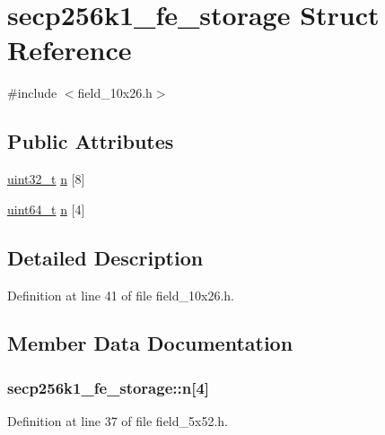 \hypertarget{structsecp256k1__fe__storage}{}\section{secp256k1\+\_\+fe\+\_\+storage Struct Reference}
\label{structsecp256k1__fe__storage}


{\ttfamily \#include $<$field\+\_\+10x26.\+h$>$}

\subsection*{Public Attributes}
\begin{DoxyCompactItemize}
\item 
\hyperlink{stdint_8h_a435d1572bf3f880d55459d9805097f62}{uint32\+\_\+t} \hyperlink{structsecp256k1__fe__storage_a63f0548b6674a57ab1d2c6271008c037}{n} \mbox{[}8\mbox{]}
\item 
\hyperlink{stdint_8h_aaa5d1cd013383c889537491c3cfd9aad}{uint64\+\_\+t} \hyperlink{structsecp256k1__fe__storage_af4231823b7dc6c5f7837f2270d8d19e7}{n} \mbox{[}4\mbox{]}
\end{DoxyCompactItemize}


\subsection{Detailed Description}


Definition at line 41 of file field\+\_\+10x26.\+h.



\subsection{Member Data Documentation}
\hypertarget{structsecp256k1__fe__storage_af4231823b7dc6c5f7837f2270d8d19e7}{}
\subsubsection[{n}]{ secp256k1\+\_\+fe\+\_\+storage\+::n\mbox{[}4\mbox{]}}\label{structsecp256k1__fe__storage_af4231823b7dc6c5f7837f2270d8d19e7}


Definition at line 37 of file field\+\_\+5x52.\+h.

\hypertarget{structsecp256k1__fe__storage_a63f0548b6674a57ab1d2c6271008c037}{}
